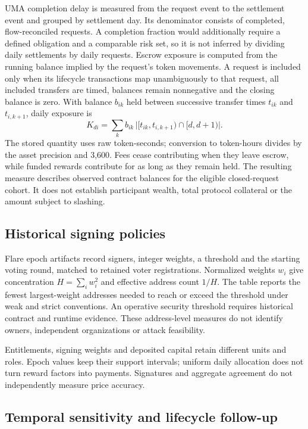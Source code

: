 UMA completion delay is measured from the request event to the settlement event and grouped by settlement day. Its denominator consists of completed, flow-reconciled requests. A completion fraction would additionally require a defined obligation and a comparable risk set, so it is not inferred by dividing daily settlements by daily requests. Escrow exposure is computed from the running balance implied by the request's token movements. A request is included only when its lifecycle transactions map unambiguously to that request, all included transfers are timed, balances remain nonnegative and the closing balance is zero. With balance $b_{ik}$ held between successive transfer times $t_{ik}$ and $t_{i,k+1}$, daily exposure is
\begin{equation}
 K_{di}=\sum_k b_{ik}\,\bigl|[t_{ik},t_{i,k+1})\cap[d,d+1)\bigr| .
\end{equation}
The stored quantity uses raw token-seconds; conversion to token-hours divides by the asset precision and 3,600. Fees cease contributing when they leave escrow, while funded rewards contribute for as long as they remain held. The resulting measure describes observed contract balances for the eligible closed-request cohort. It does not establish participant wealth, total protocol collateral or the amount subject to slashing.

\subsection{Historical signing policies}

Flare epoch artifacts record signers, integer weights, a threshold and the starting voting round, matched to retained voter registrations. Normalized weights $w_i$ give concentration $H=\sum_i w_i^2$ and effective address count $1/H$. The table reports the fewest largest-weight addresses needed to reach or exceed the threshold under weak and strict conventions. An operative security threshold requires historical contract and runtime evidence. These address-level measures do not identify owners, independent organizations or attack feasibility.

Entitlements, signing weights and deposited capital retain different units and roles. Epoch values keep their support intervals; uniform daily allocation does not turn reward factors into payments. Signatures and aggregate agreement do not independently measure price accuracy.

\subsection{Temporal sensitivity and lifecycle follow-up}

